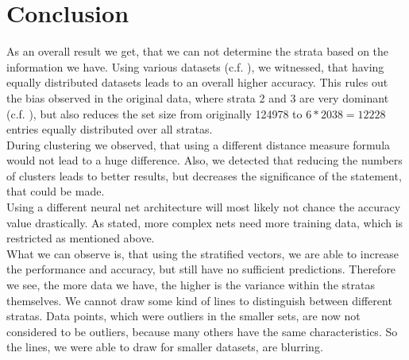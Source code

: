 \section{Conclusion} \label{sec: observation}
	As an overall result we get, that we can not determine the strata based on the information we have.
	Using various datasets (c.f. ), we witnessed, that having equally distributed datasets leads to an overall higher accuracy. This rules out the bias observed in the original data, where strata 2 and 3 are very dominant (c.f. ), but also reduces the set size from originally 124978 to $6*2038=12228$ entries equally distributed over all stratas.\\
	During clustering we observed, that using a different distance measure formula would not lead to a huge difference. Also, we detected that reducing the numbers of clusters leads to better results, but decreases the significance of the statement, that could be made.\\
	Using a different neural net architecture will most likely not chance the accuracy value drastically. As stated, more complex nets need more training data, which is restricted as mentioned above.\\
	What we can observe is, that using the stratified vectors, we are able to increase the performance and accuracy, but still have no sufficient predictions. Therefore we see, the more data we have, the higher is the variance within the stratas themselves. We cannot draw some kind of lines to distinguish between different stratas. Data points, which were outliers in the smaller sets, are now not considered to be outliers, because many others have the same characteristics. So the lines, we were able to draw for smaller datasets, are blurring.\\ %